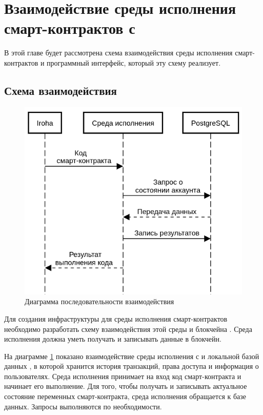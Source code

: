 \section{Взаимодействие среды исполнения смарт-кон\-трак\-тов с }
В этой главе будет рассмотрена схема взаимодействия среды исполнения смарт-контрактов и программный интерфейс, который эту схему реализует.
\subsection{Схема взаимодействия}
\label{Interaction}
\begin{figure}[h]
    \includegraphics[width=\columnwidth]{interaction.png}
	\caption{Диаграмма последовательности взаимодействия}
	\label {interaction}
\end{figure}
Для создания инфраструктуры для среды исполнения смарт-кон\-трак\-тов необходимо разработать схему взаимодействия этой среды и блокчейна .
Среда исполнения должна уметь получать и записывать данные в блокчейн.

На диаграмме \ref{interaction} показано взаимодействие среды исполнения с  и локальной базой данных , в которой хранится история транзакций, права доступа и информация о пользователях.
Среда исполнения принимает на вход код смарт-контракта и начинает его выполнение.
Для того, чтобы получать и записывать актуальное состояние переменных смарт-контракта, среда исполнения обращается к базе данных.
Запросы выполняются по необходимости.

